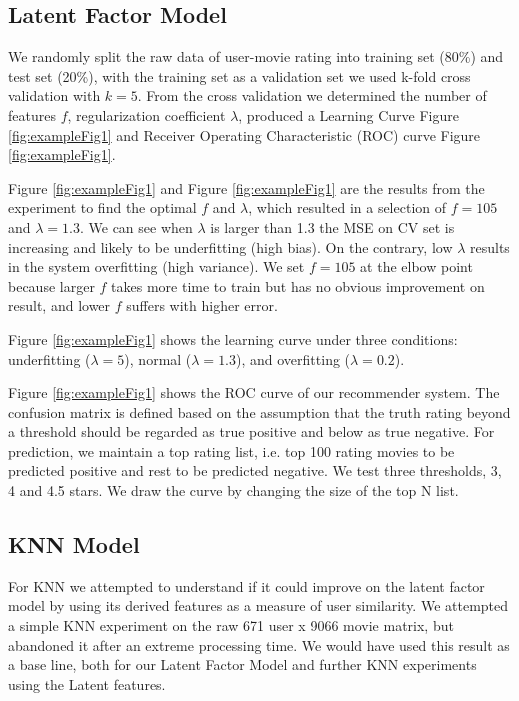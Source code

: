 \documentclass[12pt]{article}
\begin{document}
\subsection{Latent Factor Model}
We randomly split the raw data of user-movie rating into training set (80\%) and test set (20\%), with the training set as a validation set we used k-fold cross validation with $k=5$. From the cross validation we determined the number of features $f$, regularization coefficient $\lambda$, produced a Learning Curve Figure \ref{fig:exampleFig1} and Receiver Operating Characteristic (ROC) curve Figure \ref{fig:exampleFig1}. 

Figure \ref{fig:exampleFig1} and Figure \ref{fig:exampleFig1} are the results from the experiment to find the optimal $f$ and $\lambda$, which resulted in a selection of $f=105$ and $\lambda = 1.3$. We can see when $\lambda$ is larger than 1.3 the MSE on CV set is increasing and likely to be underfitting (high bias). On the contrary, low $\lambda$ results in the system overfitting (high variance). We set $f=105$ at the elbow point because larger $f$ takes more time to train but has no obvious improvement on result, and lower $f$ suffers with higher error.

Figure \ref{fig:exampleFig1} shows the learning curve under three conditions: underfitting ($\lambda = 5$), normal ($\lambda = 1.3$), and overfitting ($\lambda = 0.2$).

Figure \ref{fig:exampleFig1} shows the ROC curve of our recommender system. The confusion matrix is defined based on the assumption that the truth rating beyond a threshold should be regarded as true positive and below as true negative\cite{CF_Recsys_Survey}. For prediction, we maintain a top rating list, i.e. top 100 rating movies to be predicted positive and rest to be predicted negative. We test three thresholds, 3, 4 and 4.5 stars. We draw the curve by changing the size of the top N list.

\subsection{KNN Model}
For KNN we attempted to understand if it could improve on the latent factor model by using its derived features as a measure of user similarity. We attempted a simple KNN experiment on the raw 671 user x 9066 movie matrix, but abandoned it after an extreme processing time. We would have used this result as a base line, both for our Latent Factor Model and further KNN experiments using the Latent features.
\end{document}
